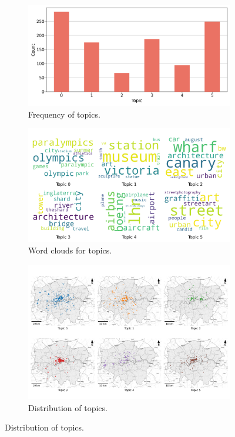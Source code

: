 \documentclass{article}
\theoremstyle{remark}
\begin{document}
\begin{figure}[!h]
    \centering
    \begin{subfigure}{0.45\textwidth}
        \centering
        \includegraphics[width=\linewidth]{figures/places_sense_weekday_tourists.png} 
        \caption{Frequency of topics.}
        \label{fig:places_sense_weekday_tourists}
    \end{subfigure}
    \hfill
    \begin{subfigure}{0.5\textwidth}
        \centering
        \includegraphics[width=\linewidth]{figures/topics_weekday_tourists.png} 
        \caption{Word clouds for topics.}
        \label{fig:topics_weekday_tourists}
    \end{subfigure}
    
    \begin{subfigure}{0.9\textwidth}
        \centering
        \includegraphics[width=\linewidth]{figures/topics_distribution_weekday_tourists.png} 
        \caption{Distribution of topics.}
        \label{fig:topics_distribution_weekday_tourists}
    \end{subfigure}


\end{figure}
\end{document}
